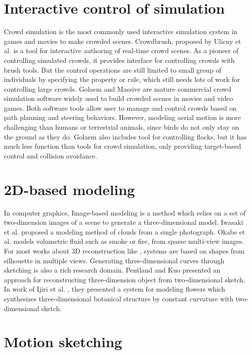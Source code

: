 \section{Interactive control of simulation}

Crowd simulation is the most commonly used interactive simulation system in games and movies to make crowded scenes. Crowdbrush, proposed by Ulicny et al. \cite{Brush} is a tool for interactive authoring of real-time crowd scenes. As a pioneer of controlling simulated crowds, it provides interface for controlling crowds with brush tools. But the control operations are still limited to small group of individuals by specifying the property or rule, which still needs lots of work for controlling large crowds. Golaem\cite{Golaem} and Massive\cite{Massive} are mature commercial crowd simulation software widely used to build crowded scenes in movies and video games. Both software tools allow user to manage and control crowds based on path planning and steering behaviors. However, modeling aerial motion is more challenging than humans or terrestrial animals, since birds do not only stay on the ground as they do. Golaem also includes tool for controlling flocks, but it has much less function than tools for crowd simulation, only providing target-based control and collision avoidance.

\section{2D-based modeling}

In computer graphics, Image-based modeling is a method which relies on a set of two-dimension images of a scene to generate a three-dimensional model. Iwasaki et al. \cite{Cloud} proposed a modeling method of clouds from a single photograph. Okabe et al. \cite{Fluid} models volumetric fluid such as smoke or fire, from sparse multi-view images. For most works about 3D reconstruction like \cite{Reconstruction}, systems are based on shapes from silhouette in multiple views. Generating three-dimensional curves through sketching is also a rich research domain. Pentland and Kuo \cite{Sketch} presented an approach for reconstructing three-dimension object from two-dimensional sketch. In work of Ijiri et al. \cite{Plant}, they presented a system for modeling flowers which synthesizes three-dimensional botanical structure by constant curvature with two-dimensional sketch.


\section{Motion sketching}

